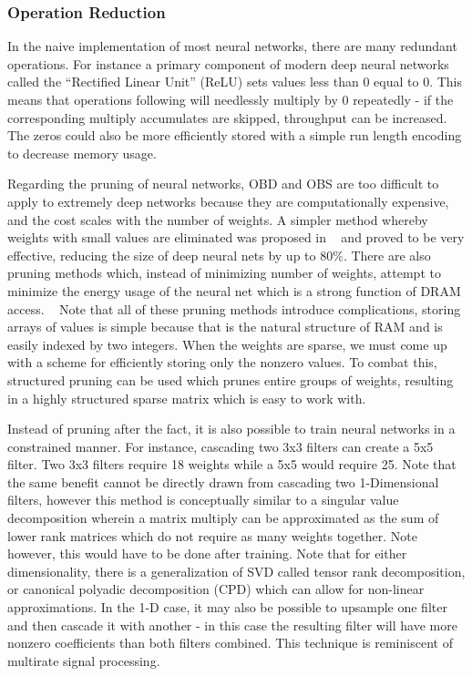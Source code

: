 \subsubsection{Operation Reduction}
In the naive implementation of most neural networks, there are many redundant operations.  For instance a primary component of modern deep neural networks called the ``Rectified Linear Unit'' (ReLU) sets values less than 0 equal to 0.  This means that operations following will needlessly multiply by 0 repeatedly - if the corresponding multiply accumulates are skipped, throughput can be increased.  The zeros could also be more efficiently stored with a simple run length encoding to decrease memory usage. ~\cite{DBLP:journals/corr/SzeCYE17}

Regarding the pruning of neural networks, OBD and OBS are too difficult to apply to extremely deep networks because they are computationally expensive, and the cost scales with the number of weights.  A simpler method whereby weights with small values are eliminated was proposed in ~\cite{DBLP:journals/corr/HanPTD15} and proved to be very effective, reducing the size of deep neural nets by up to $80\%$.  There are also pruning methods which, instead of minimizing number of weights, attempt to minimize the energy usage of the neural net which is a strong function of DRAM access. ~\cite{DBLP:journals/corr/YangCS16a}  Note that all of these pruning methods introduce complications, storing arrays of values is simple because that is the natural structure of RAM and is easily indexed by two integers.  When the weights are sparse, we must come up with a scheme for efficiently storing only the nonzero values.  To combat this, structured pruning can be used which prunes entire groups of weights, resulting in a highly structured sparse matrix which is easy to work with. ~\cite{Yu:2017:SCD:3140659.3080215}

Instead of pruning after the fact, it is also possible to train neural networks in a constrained manner.  For instance, cascading two 3x3 filters can create a 5x5 filter.  Two 3x3 filters require 18 weights while a 5x5 would require 25.  Note that the same benefit cannot be directly drawn from cascading two 1-Dimensional filters, however this method is conceptually similar to a singular value decomposition wherein a matrix multiply can be approximated as the sum of lower rank matrices which do not require as many weights together.  Note however, this would have to be done after training.  Note that for either dimensionality, there is a generalization of SVD called tensor rank decomposition, or canonical polyadic decomposition (CPD) which can allow for non-linear approximations. In the 1-D case, it may also be possible to upsample one filter and then cascade it with another - in this case the resulting filter will have more nonzero coefficients than both filters combined.  This technique is reminiscent of multirate signal processing.



